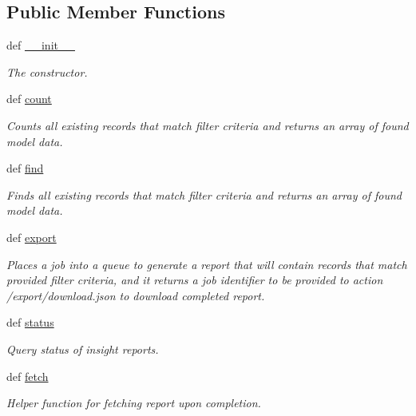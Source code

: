 \subsection*{Public Member Functions}
\begin{DoxyCompactItemize}
\item 
def \hyperlink{classtune_1_1management_1_1reports_1_1reports__insights__base_1_1ReportsInsightBase_a92ce64372ea1665fb6826883a2739f3d}{\-\_\-\-\_\-init\-\_\-\-\_\-}
\begin{DoxyCompactList}\small\item\em The constructor. \end{DoxyCompactList}\item 
def \hyperlink{classtune_1_1management_1_1reports_1_1reports__insights__base_1_1ReportsInsightBase_a6333765e99d27cf78b6f7bac1260e7c1}{count}
\begin{DoxyCompactList}\small\item\em Counts all existing records that match filter criteria and returns an array of found model data. \end{DoxyCompactList}\item 
def \hyperlink{classtune_1_1management_1_1reports_1_1reports__insights__base_1_1ReportsInsightBase_a3b2e66b7d0cc8024605af26ca9792bd3}{find}
\begin{DoxyCompactList}\small\item\em Finds all existing records that match filter criteria and returns an array of found model data. \end{DoxyCompactList}\item 
def \hyperlink{classtune_1_1management_1_1reports_1_1reports__insights__base_1_1ReportsInsightBase_a8bee2fdfa90cf8a89064e23207c6441f}{export}
\begin{DoxyCompactList}\small\item\em Places a job into a queue to generate a report that will contain records that match provided filter criteria, and it returns a job identifier to be provided to action /export/download.json to download completed report. \end{DoxyCompactList}\item 
def \hyperlink{classtune_1_1management_1_1reports_1_1reports__insights__base_1_1ReportsInsightBase_a60bbb91121fe5d73863303ace66ae81a}{status}
\begin{DoxyCompactList}\small\item\em Query status of insight reports. \end{DoxyCompactList}\item 
def \hyperlink{classtune_1_1management_1_1reports_1_1reports__insights__base_1_1ReportsInsightBase_af7c12d70fdcb9b557ecf5fa3ee3dcf10}{fetch}
\begin{DoxyCompactList}\small\item\em Helper function for fetching report upon completion. \end{DoxyCompactList}\end{DoxyCompactItemize}
